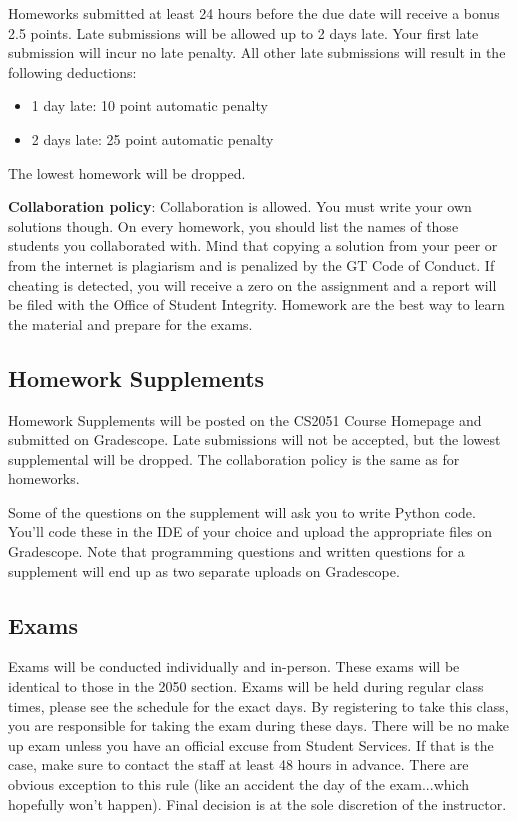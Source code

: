 \documentclass{article}
\begin{document}
    \vspace{3mm}
    Homeworks submitted at least 24 hours before the due date will receive a bonus 2.5 points. Late submissions will be allowed up to 2 days late.  Your first late submission will incur no late penalty. All other late submissions will result in the following deductions: 
    \begin{itemize}
        \item 1 day late: 10 point automatic penalty 
        \item 2 days late: 25 point automatic penalty
    \end{itemize}
    The lowest homework will be dropped.
    
    \vspace{3mm}
    \textbf{Collaboration policy}: Collaboration is allowed. You must write your own solutions though. On every homework, you should list the names of those students you collaborated with. Mind that copying a solution from your peer or from the internet is plagiarism and is penalized by the GT Code of Conduct. If cheating is detected, you will receive a zero on the assignment and a report will be filed with the Office of Student Integrity. Homework are the best way to learn the material and prepare for the exams.

\subsection*{Homework Supplements}
    Homework Supplements will be posted on the CS2051 Course Homepage and submitted on Gradescope. Late submissions will not be accepted, but the lowest supplemental will be dropped. The collaboration policy is the same as for homeworks.
    
    \vspace{3mm}
    Some of the questions on the supplement will ask you to write Python code. You’ll code these in the IDE of your choice and upload the appropriate files on Gradescope. Note that programming questions and written questions for a supplement will end up as two separate uploads on Gradescope.

\subsection*{Exams}
    Exams will be conducted individually and in-person. These exams will be identical to those in the 2050 section. Exams will be held during regular class times, please see the schedule for the exact days. By registering to take this class, you are responsible for taking the exam during these days. There will be no make up exam unless you have an official excuse from Student Services. If that is the case, make sure to contact the staff at least 48 hours in advance. There are obvious exception to this rule (like an accident the day of the exam...which hopefully won’t happen). Final decision is at the sole discretion of the instructor.
\end{document}
